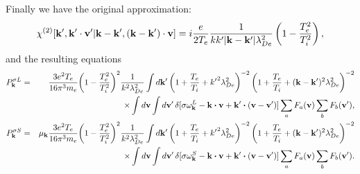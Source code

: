 \documentclass[12pt,a4paper,ruledheader]{report}
\begin{document}
\begin{appendix}
Finally we have the original approximation:
\begin{equation}
\chi^{(2)}[{\bf k'},{\bf k'\cdot v'}|{\bf k-k'},({\bf k-k'})\cdot{\bf v}]
=i\frac{e}{2T_e}\frac{1}{k k'|{\bf k-k'}|\lambda_{De}^2}
\left(1-\frac{T_e^2}{T_i^2}\right),
\end{equation}
and the resulting equations
\begin{eqnarray}
\label{bremsstL-A}
P_{\bf k}^{\sigma L} &=& \frac{3e^2T_e}{16\pi^3m_e}
\biggl(1-\frac{T_e^2}{T_i^2}\biggr)^2\frac{1}{k^2\lambda_{De}^2}
\int d{\bf k}'\left(1+\frac{T_e}{T_i}
+{k'}^2\lambda_{De}^2\right)^{-2}\left(1+\frac{T_e}{T_i}
+({\bf k}-{\bf k}')^2\lambda_{De}^2\right)^{-2}
\nonumber\\
&& \times\int d{\bf v}\int d{\bf v}'\,
\delta[\sigma\omega_{\bf k}^L-{\bf k}\bm{\cdot}{\bf v}
+{\bf k}'\bm{\cdot}({\bf v}-{\bf v}')]
\sum_aF_a({\bf v})\sum_bF_b({\bf v}'),
\\
\label{bremsstS-A}
P_{\bf k}^{\sigma S} &=& \mu_{\bf k}\frac{3e^2T_e}{16\pi^3m_e}
\biggl(1-\frac{T_e^2}{T_i^2}\biggr)^2\frac{1}{k^2\lambda_{De}^2}
\int d{\bf k}'\left(1+\frac{T_e}{T_i}
+{k'}^2\lambda_{De}^2\right)^{-2}\left(1+\frac{T_e}{T_i}
+({\bf k}-{\bf k}')^2\lambda_{De}^2\right)^{-2}
\nonumber\\
&& \times\int d{\bf v}\int d{\bf v}'\,
\delta[\sigma\omega_{\bf k}^S-{\bf k}\bm{\cdot}{\bf v}
+{\bf k}'\bm{\cdot}({\bf v}-{\bf v}')]
\sum_aF_a({\bf v})\sum_bF_b({\bf v}').
\end{eqnarray}


\end{appendix}
\end{document}
